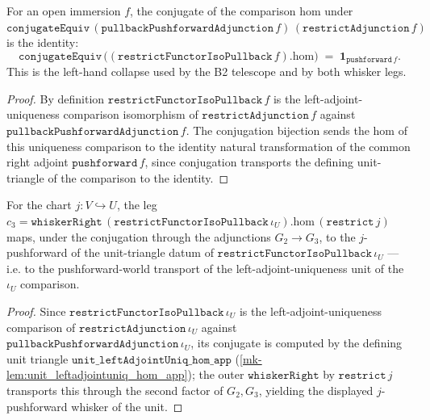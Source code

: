 \begin{lemma}\label{mk-lem:conjugateequiv_restrictfunctorisopullback_hom}
  \leanok

  For an open immersion \(f\), the conjugate of the comparison hom under
  \(\mathtt{conjugateEquiv}\,(\mathtt{pullbackPushforwardAdjunction}\,f)\,(\mathtt{restrictAdjunction}\,f)\)
  is the identity:
  \[
    \mathtt{conjugateEquiv}\,\bigl((\mathtt{restrictFunctorIsoPullback}\,f).\mathrm{hom}\bigr)
      \;=\; \mathbf{1}_{\mathtt{pushforward}\,f}.
  \]
  This is the left-hand collapse used by the B2 telescope and by both whisker legs.
\end{lemma}
\begin{proof}
  \leanok
  By definition \(\mathtt{restrictFunctorIsoPullback}\,f\) is the left-adjoint-uniqueness
  comparison isomorphism of \(\mathtt{restrictAdjunction}\,f\) against
  \(\mathtt{pullbackPushforwardAdjunction}\,f\). The conjugation bijection sends the hom of this
  uniqueness comparison to the identity natural transformation of the common right adjoint
  \(\mathtt{pushforward}\,f\), since conjugation transports the defining unit-triangle of the
  comparison to the identity.
\end{proof}

\begin{lemma}\label{mk-lem:conjugateequiv_restrictfunctorisopullback_whiskerright}
  \leanok

  For the chart \(j : V \hookrightarrow U\), the leg
  \(c_3 = \mathtt{whiskerRight}\,(\mathtt{restrictFunctorIsoPullback}\,\iota_U).\mathrm{hom}\,
  (\mathtt{restrict}\,j)\) maps, under the conjugation through the adjunctions \(G_2 \to G_3\), to the
  \(j\)-pushforward of the unit-triangle datum of
  \(\mathtt{restrictFunctorIsoPullback}\,\iota_U\) --- i.e. to the pushforward-world transport of the
  left-adjoint-uniqueness unit of the \(\iota_U\) comparison.
\end{lemma}
\begin{proof}
  \leanok
  Since \(\mathtt{restrictFunctorIsoPullback}\,\iota_U\) is the left-adjoint-uniqueness comparison
  of \(\mathtt{restrictAdjunction}\,\iota_U\) against
  \(\mathtt{pullbackPushforwardAdjunction}\,\iota_U\), its conjugate is computed by the defining unit
  triangle \(\mathtt{unit\_leftAdjointUniq\_hom\_app}\) (\ref{mk-lem:unit_leftadjointuniq_hom_app}); the
  outer \(\mathtt{whiskerRight}\) by \(\mathtt{restrict}\,j\) transports this through the second factor
  of \(G_2, G_3\), yielding the displayed \(j\)-pushforward whisker of the unit.
\end{proof}

